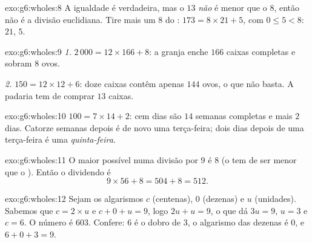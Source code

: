 \begin{solution}{exo:g6:wholes:8}
A igualdade é verdadeira, mas o  $13$ \emph{não} é menor que o
 $8$, então não é a divisão euclidiana. Tire mais um $8$ do
: $173 = 8 \times 21 + 5$, com $0 \leq 5 < 8$:  $21$,
 $5$.
\end{solution}

\begin{solution}{exo:g6:wholes:9}
\emph{1.} $2\,000 = 12 \times 166 + 8$: a granja enche $166$ caixas
completas e sobram $8$ ovos.

\emph{2.} $150 = 12 \times 12 + 6$: doze caixas contêm apenas $144$
ovos, o que não basta. A padaria tem de comprar $13$ caixas.
\end{solution}

\begin{solution}{exo:g6:wholes:10}
$100 = 7 \times 14 + 2$: cem dias são $14$ semanas completas e mais $2$
dias. Catorze semanas depois é de novo uma terça-feira; dois dias depois
de uma terça-feira é uma \emph{quinta-feira}.
\end{solution}

\begin{solution}{exo:g6:wholes:11}
O maior  possível numa divisão por $9$ é $8$ (o  tem de ser
menor que o ). Então o dividendo é
\[
9 \times 56 + 8 = 504 + 8 = 512 .
\]
\end{solution}

\begin{solution}{exo:g6:wholes:12}
Sejam os algarismos $c$ (centenas), $0$ (dezenas) e $u$ (unidades).
Sabemos que $c = 2 \times u$ e $c + 0 + u = 9$, logo $2u + u = 9$, o que
dá $3u = 9$, $u = 3$ e $c = 6$. O número é $603$. Confere: $6$ é o dobro
de $3$, o algarismo das dezenas é $0$, e $6 + 0 + 3 = 9$.
\end{solution}

